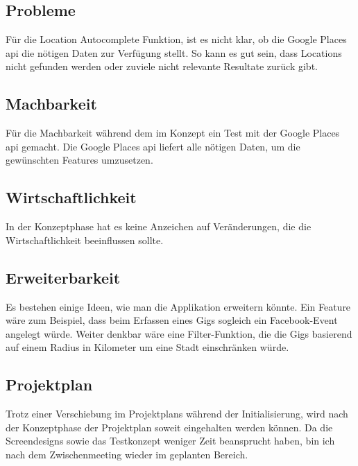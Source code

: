 \subsection{Probleme}

Für die Location Autocomplete Funktion, ist es nicht klar, ob die
Google Places \acrshort{api} die nötigen Daten zur Verfügung stellt. So kann es gut sein,
dass Locations nicht gefunden werden oder zuviele nicht relevante Resultate
zurück gibt.

\subsection{Machbarkeit}

Für die Machbarkeit während dem im Konzept ein Test mit der Google Places \acrshort{api}
gemacht. Die Google Places \acrshort{api} liefert alle nötigen Daten, um die gewünschten
Features umzusetzen.

\subsection{Wirtschaftlichkeit}

In der Konzeptphase hat es keine Anzeichen auf Veränderungen, die die
Wirtschaftlichkeit beeinflussen sollte.

\subsection{Erweiterbarkeit}

Es bestehen einige Ideen, wie man die Applikation erweitern könnte. Ein Feature
wäre zum Beispiel, dass beim Erfassen eines Gigs sogleich ein Facebook-Event
angelegt würde. Weiter denkbar wäre eine Filter-Funktion, die die Gigs basierend
auf einem Radius in Kilometer um eine Stadt einschränken würde.

\subsection{Projektplan}

Trotz einer Verschiebung im Projektplans während der Initialisierung, wird nach
der Konzeptphase der Projektplan soweit eingehalten werden können. Da die
Screendesigns sowie das Testkonzept weniger Zeit beansprucht haben, bin ich
nach dem Zwischenmeeting wieder im geplanten Bereich.
